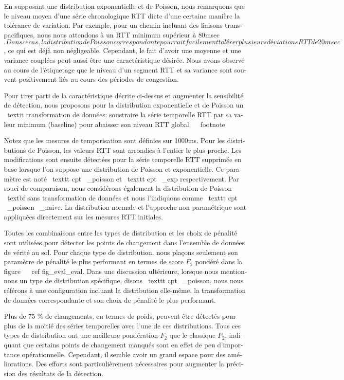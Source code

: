 \begin{otherlanguage}{french}
{En supposant une distribution exponentielle et de Poisson, nous remarquons que le niveau moyen d'une série chronologique RTT dicte d'une certaine manière la tolérance de variation.
Par exemple, pour un chemin incluant des liaisons transpacifiques, nous nous attendons à un RTT minimum supérieur à 80msec $.
Dans ce cas, la distribution de Poisson correspondante pourrait facilement tolérer plusieurs déviations RTT de 20 msec $, ce qui est déjà non négligeable.
Cependant, le fait d'avoir une moyenne et une variance couplées peut aussi être une caractéristique désirée.
Nous avons observé au cours de l'étiquetage que le niveau d'un segment RTT et sa variance sont souvent positivement liés au cours des périodes de congestion.

Pour tirer parti de la caractéristique décrite ci-dessus et augmenter la sensibilité de détection, nous proposons pour la distribution exponentielle et de Poisson un \ textit {transformation de données}: soustraire la série temporelle RTT par sa valeur minimum (baseline) pour abaisser son niveau RTT global ~ \ footnote {Notez que les mesures de temporisation sont définies sur 1000ms.
Pour les distributions de Poisson, les valeurs RTT sont arrondies à l'entier le plus proche.
Les modifications sont ensuite détectées pour la série temporelle RTT supprimée en base lorsque l'on suppose une distribution de Poisson et exponentielle.
Ce paramètre est noté \ texttt {cpt \ _poisson} et \ texttt {cpt \ _exp} respectivement.
Par souci de comparaison, nous considérons également la distribution de Poisson \ textbf {sans transformation de données} et nous l'indiquons comme \ texttt {cpt \ _poisson \ _naive}.
La distribution normale et l'approche non-paramétrique sont appliquées directement sur les mesures RTT initiales.

Toutes les combinaisons entre les types de distribution et les choix de pénalité sont utilisées pour détecter les points de changement dans l'ensemble de données de vérité au sol.
Pour chaque type de distribution, nous plaçons seulement son paramètre de pénalité le plus performant en termes de score $ F_2 $ pondéré dans la figure ~ \ ref {fig_eval_eval}.
Dans une discussion ultérieure, lorsque nous mentionnons un type de distribution spécifique, disons \ texttt {cpt \ _poisson}, nous nous référons à une configuration incluant la distribution elle-même, la transformation de données correspondante et son choix de pénalité le plus performant.

Plus de 75 $ \% $ de changements, en termes de poids, peuvent être détectés pour plus de la moitié des séries temporelles avec l'une de ces distributions.
Tous ces types de distribution ont une meilleure pondération $ F_2 $ que le classique $ F_2 $, indiquant que certains points de changement manqués sont en effet de peu d'importance opérationnelle.
Cependant, il semble avoir un grand espace pour des améliorations.
Des efforts sont particulièrement nécessaires pour augmenter la précision des résultats de la détection.

}}
\end{otherlanguage}
